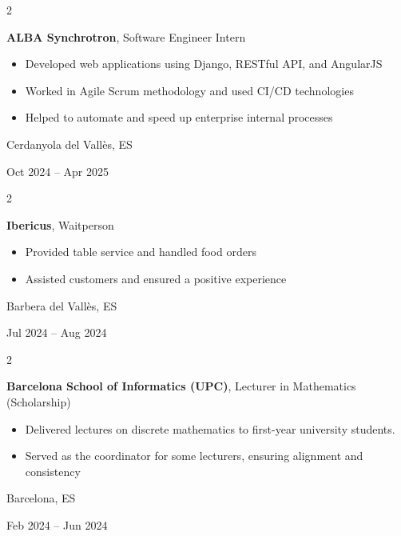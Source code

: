 \documentclass[10pt, letterpaper]{article}
\newenvironment{highlights}{
    \begin{itemize}[
        topsep=0.10 cm,
        parsep=0.10 cm,
        partopsep=0pt,
        itemsep=0pt,
        leftmargin=0.4 cm + 10pt
    ]
}{
    \end{itemize}
} %
\newenvironment{twocolentry}[2][]{
    \onecolentry
    \def\secondColumn{#2}
    \setcolumnwidth{\fill, 4.5 cm}
    \begin{paracol}{2}
}{
    \switchcolumn \raggedleft \secondColumn
    \end{paracol}
    \endonecolentry
} %
\begin{document}
        \vspace{0.2 cm}
        
        \begin{twocolentry}{
            Cerdanyola del Vallès, ES

            Oct 2024 – Apr 2025
        }
            \textbf{ALBA Synchrotron}, Software Engineer Intern
            \begin{highlights}
                \item Developed web applications using Django, RESTful API, and AngularJS
                \item Worked in Agile Scrum methodology and used CI/CD technologies
                \item Helped to automate and speed up enterprise internal processes
            \end{highlights}
        \end{twocolentry}

        \vspace{0.2 cm}

        \begin{twocolentry}{
            Barbera del Vallès, ES

            Jul 2024 – Aug 2024
        }
            \textbf{Ibericus}, Waitperson
            \begin{highlights}
                \item Provided table service and handled food orders
                \item Assisted customers and ensured a positive experience
            \end{highlights}
        \end{twocolentry}

        \vspace{0.2 cm}

        \begin{twocolentry}{
            Barcelona, ES

            Feb 2024 – Jun 2024
        }
            \textbf{Barcelona School of Informatics (UPC)}, Lecturer in Mathematics (Scholarship)
            \begin{highlights}
                \item Delivered lectures on discrete mathematics to first-year university students.
                \item Served as the coordinator for some lecturers, ensuring alignment and consistency
            \end{highlights}
        \end{twocolentry}
\end{document}

